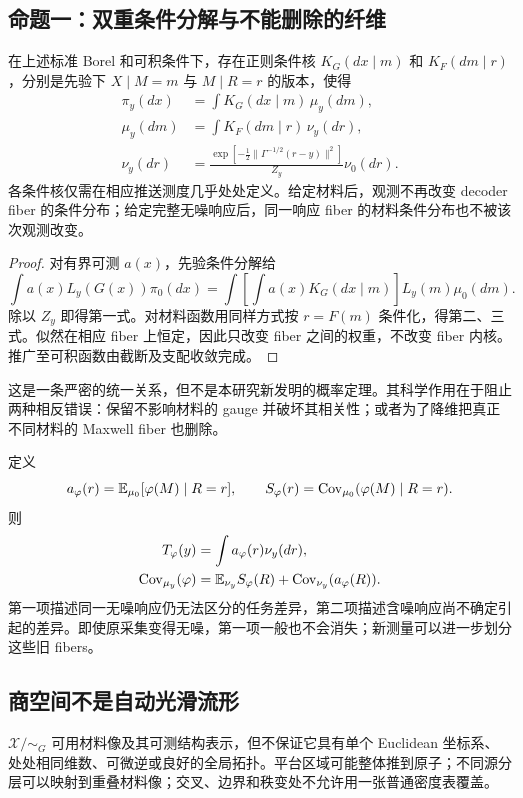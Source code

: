 \subsection{命题一：双重条件分解与不能删除的纤维}
\begin{theorem}
\label{thm:disintegration}
在上述标准 Borel 和可积条件下，存在正则条件核 $K_G(dx\mid m)$ 和 $K_F(dm\mid r)$，分别是先验下 $X\mid M=m$ 与 $M\mid R=r$ 的版本，使得
\begin{align}
\pi_y(dx)&=\int K_G(dx\mid m)\,\mu_y(dm),\\
\mu_y(dm)&=\int K_F(dm\mid r)\,\nu_y(dr),\\
\nu_y(dr)&=\frac{\exp[-\frac12\|\Gamma^{-1/2}(r-y)\|^2]}{Z_y}\nu_0(dr).
\label{eq:double-disintegration}
\end{align}
各条件核仅需在相应推送测度几乎处处定义。给定材料后，观测不再改变 decoder fiber 的条件分布；给定完整无噪响应后，同一响应 fiber 的材料条件分布也不被该次观测改变。
\end{theorem}
\begin{proof}
对有界可测 $a(x)$，先验条件分解给
\[
\int a(x)L_y(G(x))\pi_0(dx)
=\int \!\left[\int a(x)K_G(dx\mid m)\right]L_y(m)\mu_0(dm).
\]
除以 $Z_y$ 即得第一式。对材料函数用同样方式按 $r=F(m)$ 条件化，得第二、三式。似然在相应 fiber 上恒定，因此只改变 fiber 之间的权重，不改变 fiber 内核。推广至可积函数由截断及支配收敛完成。
\end{proof}

这是一条严密的统一关系，但不是本研究新发明的概率定理。其科学作用在于阻止两种相反错误：保留不影响材料的 gauge 并破坏其相关性；或者为了降维把真正不同材料的 Maxwell fiber 也删除。

定义
\[
a_\varphi(r)=\mathbb E_{\mu_0}[\varphi(M)\mid R=r],\qquad
S_\varphi(r)=\operatorname{Cov}_{\mu_0}(\varphi(M)\mid R=r).
\]
则
\begin{align}
T_\varphi(y)&=\int a_\varphi(r)\nu_y(dr),\\
\operatorname{Cov}_{\mu_y}(\varphi)
&=\mathbb E_{\nu_y}S_\varphi(R)
+\operatorname{Cov}_{\nu_y}(a_\varphi(R)).
\label{eq:risk-disintegration}
\end{align}
第一项描述同一无噪响应仍无法区分的任务差异，第二项描述含噪响应尚不确定引起的差异。即使原采集变得无噪，第一项一般也不会消失；新测量可以进一步划分这些旧 fibers。

\subsection{商空间不是自动光滑流形}
$\mathcal X/{\sim_G}$ 可用材料像及其可测结构表示，但不保证它具有单个 Euclidean 坐标系、处处相同维数、可微逆或良好的全局拓扑。平台区域可能整体推到原子；不同源分层可以映射到重叠材料像；交叉、边界和秩变处不允许用一张普通密度表覆盖。

